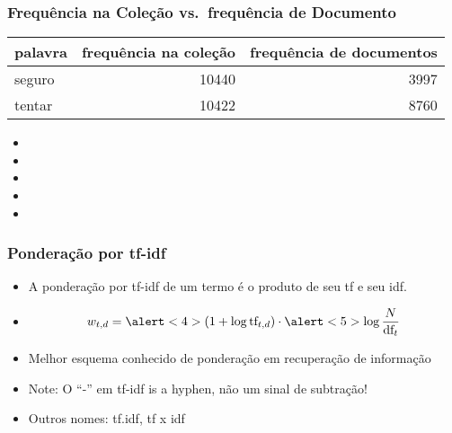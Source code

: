 \documentclass[compress]{beamer}
\def\myblue#1{\textcolor{texblue}{#1}}
\def\mygreen#1{\textcolor{texgreen}{#1}}
\def\term#1{{\sc #1}}   %
\begin{document}
\begin{frame}
\frametitle{Frequência na Coleção vs.\ frequência de Documento}

\begin{tabular}{@{}lrr@{}}
palavra & frequência na coleção & frequência de documentos\\\hline
\term{seguro} & 10440 & 3997\\
\term{tentar} & 10422 & 8760
\end{tabular}

\vspace{1cm}

\begin{itemize}
\item {}
\item {}
\pause[2]
\item \visible<1->{\mygreen{Porque estes números?}}
\pause[3]
\item \visible<1->{\mygreen{Qual palavra é um melhor termo de busca (e deveria receber o maior peso)?}}
\pause[4]
\item {}
\end{itemize}


\end{frame}

\begin{frame}[<+->]
\frametitle{Ponderação por tf-idf}
\pause[2]
\begin{itemize}
\item A ponderação por tf-idf de um termo é o \myblue{produto de seu tf
  e seu idf}.
\item 
\[
 w_{t,d} = \alert<4>{(1 +\log \mbox{tf}_{t,d})} \cdot \alert<5>{\log \frac{N}{\mbox{df}_t}}
\]
\item Melhor esquema conhecido de ponderação em recuperação de informação
\item Note: O ``-'' em tf-idf is a hyphen, não um sinal de subtração!
\item Outros nomes: tf.idf, tf x idf
\end{itemize}
\end{frame}
\end{document}
